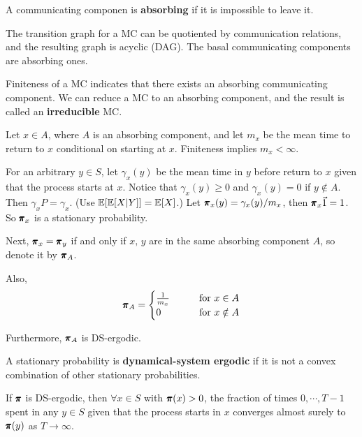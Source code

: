 \begin{definition}
    A communicating componen is \textbf{absorbing} if it is impossible to leave it.
\end{definition}

The transition graph for a MC can be quotiented by communication relations, and the resulting graph is acyclic (DAG). The basal communicating components are absorbing ones. 

Finiteness of a MC indicates that there exists an absorbing communicating component. We can reduce a MC to an absorbing component, and the result is called an \textbf{irreducible} MC.

Let $x \in A$, where $A$ is an absorbing component, and let $m_x$ be the mean time to return to $x$ conditional on starting at $x$. Finiteness implies $m_x < \infty$.

For an arbitrary $y \in S$, let $\gamma_x(y)$ be the mean time in $y$ before return to $x$ given that the process starts at $x$. Notice that $\gamma_x(y) \ge 0$ and $\gamma_x(y) = 0$ if $y \notin A$. Then $\gamma_x P = \gamma_x$. (Use $\mathbb{E} [\mathbb{E} [X|Y]] = \mathbb{E}[X]$.) Let $\pmb{\pi}_x(y) = \gamma_x(y) / m_x$, then $\pmb{\pi}_x \vec{1} = 1$. So $\pmb{\pi}_x$ is a stationary probability.

\begin{remark}
    Next, $\pmb{\pi}_x = \pmb{\pi}_y$ if and only if $x,\,y$ are in the same absorbing component $A$, so denote it by $\pmb{\pi}_A$.
\end{remark}

\begin{remark}
    Also, 
$$
\pmb{\pi}_A = 
\begin{cases}
    \frac{1}{m_x} \qquad &\text{for } x \in A \\ 
    0 \qquad &\text{for } x \notin A
\end{cases}
$$
\end{remark}


Furthermore, $\pmb{\pi}_A$ is DS-ergodic.

\begin{definition}
    A stationary probability is \textbf{dynamical-system ergodic} if it is not a convex combination of other stationary probabilities.
\end{definition}

\begin{theorem}
    If $\pmb{\pi}$ is DS-ergodic, then $\forall x \in S$ with $\pmb{\pi}(x) >0$, the fraction of times $0, \cdots, T-1$ spent in any $y \in S$ given that the process starts in $x$ converges almost surely to $\pmb{\pi}(y)$ as $T \to \infty$.
\end{theorem}

